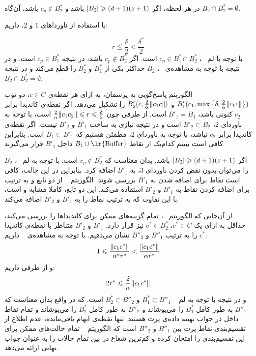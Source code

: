  در هر لحظه، اگر $\left|{B_2}\right| \geqslant (d+1)(z+1)$ باشد و $c_p \not \in B_2^*$ باشد، آن‌گاه $B_2 \cap B_2^* = \emptyset$.
 
 
 با استفاده از‌ ناورداهای $1$ و $2$، داریم:
 
$$r \leq \frac{\delta}{2} < \frac{\delta^*}{2}$$
 با توجه با لم ~، $c_p \in B_1^* \cap B_2^*$ است.
 اگر $c_p \not \in B_2^*$ باشد، در نتیجه $c_p \in B_1^*$ است.
 و در نتیجه با توجه به مشاهده‌ی ~، $B_2$ حداکثر یکی از $B_1^*$ و $B_2^*$ را قطع می‌کند و در نتیجه $B_2 \cap B_2^* = \emptyset$.
 


الگوریتم پاسخ‌گویی به پرسمان، به ازای هر نقطه‌ی $c \in C$، دو توپ 
$B_1'(c_1, \max \left\{ \delta, \frac{2}{\alpha} \|{c_1 c}\| \right\})$ و 
$B_2'(c, \frac{2}{\alpha} \|{c_1 c}\|)$
را تشکیل می‌دهد. 
اگر نقطه‌ی کاندیدا برابر $c_2$ کنونی باشد، $B'_1 = B_1$ است.
از طرفی چون $\frac{2}{\alpha}\|{c_1 c_2}\| \leqslant r \leqslant \frac{\delta}{2}$ است، با توجه به ناوردای $2$، $B'_2 \subset B_2$ است و در نتیجه نیازی به ساخت $B'_1$ و $B'_2$ نیست.
 اگر نقطه‌ی کاندیدا برابر $c_2$ نباشد، با توجه به ناوردای $2$، مطمئن هستیم که $B_1 \subset B'_1$ است. 
 بنابراین کافی است ببینم کدام‌یک از نقاط $B_1 \cup \text{\lr{Buffer}}$ داخل $B'_1$ قرار می‌گیرند.
 
 اگر $\left|{B_2}\right| \geqslant (d+1)(z+1)$ باشد, بدان معناست که $c_p \not \in B_2^*$ است.
 با توجه به لم ~، $B_2$ را می‌توان بدون نقض کردن ناوردای $3$، به $B'_1$ اضافه کرد.
بنابراین در این حالت، کافی است نقاط‌  برای اضافه شدن به $B'_1$ بررسی شوند.
الگوریتم ~ از دو تابع  و  به ترتیب برای اضافه کردن نقاط به $B'_1$ و $B'_2$ استفاده می‌کند.
این دو تابع، کاملا مشابه  و  است، با این تفاوت که به ترتیب نقاط را به $B'_1$ و $B'_2$ اضافه می‌کند.

از‌ آن‌جایی که الگوریتم ~، تمام گزینه‌های ممکن برای کاندیداها را بررسی می‌کند، حداقل به ازای یک $c^* \in C$، $c^* \in B_2^*$ نیز قرار دارد.
$B'_1$ و $B'_2$
 متناظر با نقطه‌ی کاندیدا $c^*$ را به ترتیب $B''_1$ و $B''_2$ نشان می‌دهیم.
 با توجه به مشاهده‌ی ~ داریم:
 $$1 \leqslant \frac{\|{c_1 c^*}\|}{\alpha^* r^*} < \frac{\|{c_1 c^*}\|}{\alpha r^*}$$
 و از طرفی داریم:
 $$2r^* \leqslant \frac{2}{\alpha} \|{c_1 c^*}\|$$
 و در نتیجه با توجه به لم ~
 $B_1^* \subset B''_1$ و $B_2^* \subset B''_2$
 است.
 که در واقع بدان معناست که $B''_1$ به طور کامل $B_1^*$ را می‌پوشاند و $B''_2$ به طور کامل $B_2^*$ را می‌پوشاند و تمام نقاط‌ داخل  در جواب بهینه داده‌ی پرت هستند.
 تنها نقطه‌ی ابهام باقی‌مانده، عدم اطلاع از تقسیم‌بندی نقاط پرت بین $B''_1$ و $B''_2$ است که الگوریتم ~ تمام حالت‌های ممکن برای این تقسیم‌بندی را امتحان کرده و کم‌ترین شعاع در بین تمام حالات را به عنوان جواب نهایی ارائه می‌دهد.
 
